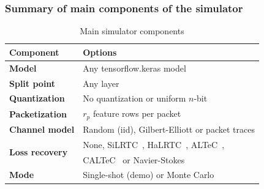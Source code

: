 \documentclass[aspectratio=169]{beamer}
\begin{document}
\begin{frame}
\frametitle{Summary of main components of the simulator}
\begin{table}[t]   \caption{Main simulator components}
  \label{tab:description:components}
  \centering
 \begin{tabular}{ l | l }
   \textbf{Component} & \textbf{Options} \\
      \hline
      \hline
      \textbf{Model} & Any tensorflow.keras model \\
      \hline  
      \textbf{Split point} & Any layer \\
      \hline
      \textbf{Quantization} & No quantization or uniform $n$-bit \\
      \hline
      \textbf{Packetization} & $r_p$ feature rows per packet \\
      \hline
      \textbf{Channel model} & Random (iid), Gilbert-Elliott or packet traces    \\
      \hline
      \multirow{2}{*}{\textbf{Loss recovery}} & None, SiLRTC~\cite{liu2012tensor}, HaLRTC~\cite{liu2012tensor}, ALTeC~\cite{Bragile2020}, \\ & CALTeC~\cite{CALTeC_ICIP_2021} or Navier-Stokes~\cite{navierstokes}\\
      \hline
      \textbf{Mode} & Single-shot (demo) or Monte Carlo\\ 
      \hline
    \end{tabular}
\end{table}
\end{frame}

\end{document}
